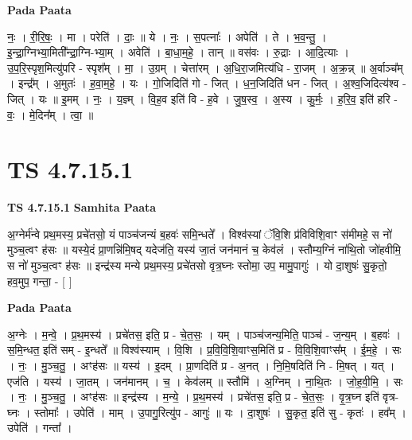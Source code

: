 \documentclass[17pt]{extarticle}
\begin{document}
\textbf{Pada Paata} \newline

नः॒ । री॒रि॒षः॒ । मा । परेति॑ । दाः॒ ॥ ये । नः॒ । स॒पत्नाः᳚ । अपेति॑ । ते । भ॒व॒न्तु॒ । इ॒न्द्रा॒ग्निभ्या॒मिती᳚न्द्रा॒ग्नि-भ्या॒म् । अवेति॑ । बा॒धा॒म॒हे॒ । तान् ॥ वस॑वः । रु॒द्राः । आ॒दि॒त्याः । उ॒प॒रि॒स्पृश॒मित्यु॑परि - स्पृश᳚म् । मा॒ । उ॒ग्रम् । चेत्ता॑रम् । अ॒धि॒रा॒जमित्य॑धि - रा॒जम् । अ॒क्र॒न्न् ॥ अ॒र्वाञ्च᳚म् । इन्द्र᳚म् । अ॒मुतः॑ । ह॒वा॒म॒हे॒ । यः । गो॒जिदिति॑ गो - जित् । ध॒न॒जिदिति॑ धन - जित् । अ॒श्व॒जिदित्य॑श्व - जित् । यः ॥ इ॒मम् । नः॒ । य॒ज्ञ्म् । वि॒ह॒व इति॑ वि - ह॒वे । जु॒ष॒स्व॒ । अ॒स्य । कु॒र्मः॒ । ह॒रि॒व॒ इति॑ हरि - वः॒ । मे॒दिन᳚म् । त्वा॒ ॥  \newline




\section*{ TS 4.7.15.1 }

\textbf{TS 4.7.15.1 } \newline
\textbf{Samhita Paata} \newline

अ॒ग्नेर्म॑न्वे प्रथ॒मस्य॒ प्रचे॑तसो॒ यं पाञ्च॑जन्यं ब॒हवः॑ समि॒न्धते᳚ । विश्व॑स्यां ॅवि॒शि प्र॑विविशि॒वाꣳ स॑मीमहे॒ स नो॑ मुञ्च॒त्वꣳ ह॑सः ॥ यस्ये॒दं प्रा॒णन्नि॑मि॒षद् यदेज॑ति॒ यस्य॑ जा॒तं जन॑मानं च॒ केव॑लं । स्तौम्य॒ग्निं ना॑थि॒तो जो॑हवीमि॒ स नो॑ मुञ्च॒त्वꣳ ह॑सः ॥ इन्द्र॑स्य मन्ये प्रथ॒मस्य॒ प्रचे॑तसो वृत्र॒घ्नः स्तोमा॒ उप॒ मामु॒पागुः॑ । यो दा॒शुषः॑ सु॒कृतो॒ हव॒मुप॒ गन्ता॒ - [  ] \newline

\textbf{Pada Paata} \newline

अ॒ग्नेः । म॒न्वे॒ । प्र॒थ॒मस्य॑ । प्रचे॑तस॒ इति॒ प्र - चे॒त॒सः॒ । यम् । पाञ्च॑जन्य॒मिति॒ पाञ्च॑ - ज॒न्य॒म् । ब॒हवः॑ । स॒मि॒न्धत॒ इति॑ सम् - इ॒न्धते᳚ ॥ विश्व॑स्याम् । वि॒शि । प्र॒वि॒वि॒शि॒वाꣳस॒मिति॑ प्र - वि॒वि॒शि॒वाꣳस᳚म् । ई॒म॒हे॒ । सः । नः॒ । मु॒ञ्च॒तु॒ । अꣳह॑सः ॥ यस्य॑ । इ॒दम् । प्रा॒णदिति॑ प्र - अ॒नत् । नि॒मि॒षदिति॑ नि - मि॒षत् । यत् । एज॑ति । यस्य॑ । जा॒तम् । जन॑मानम् । च॒ । केव॑लम् ॥ स्तौमि॑ । अ॒ग्निम् । ना॒थि॒तः । जो॒ह॒वी॒मि॒ । सः । नः॒ । मु॒ञ्च॒तु॒ । अꣳह॑सः ॥ इन्द्र॑स्य । म॒न्ये॒ । प्र॒थ॒मस्य॑ । प्रचे॑तस॒ इति॒ प्र - चे॒त॒सः॒ । वृ॒त्र॒घ्न इति॑ वृत्र-घ्नः । स्तोमाः᳚ । उपेति॑ । माम् । उ॒पागु॒रित्यु॑प - आगुः॑ ॥ यः । दा॒शुषः॑ । सु॒कृत॒ इति॑ सु - कृतः॑ । हव᳚म् । उपेति॑ । गन्ता᳚ ।  \newline
\end{document}
